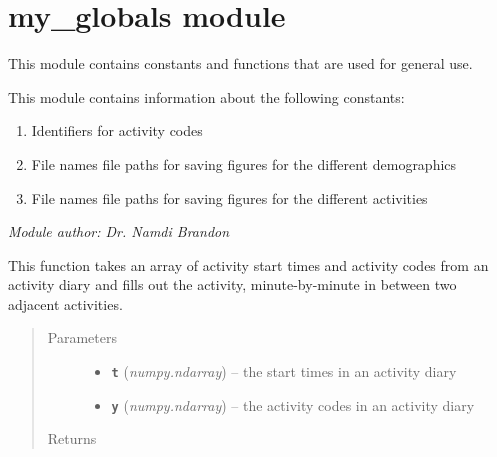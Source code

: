 \documentclass[letterpaper,10pt,english]{sphinxmanual}
\begin{document}
\section{my\_globals module}
\label{my_globals::doc}\label{my_globals:module-my_globals}\label{my_globals:my-globals-module}
This module contains constants and functions that are used for general use.

This module contains information about the following constants:
\begin{enumerate}
\item {} 
Identifiers for activity codes

\item {} 
File names file paths for saving figures for the different demographics

\item {} 
File names file paths for saving figures for the different activities

\end{enumerate}

\emph{Module author: Dr. Namdi Brandon}

\begin{fulllineitems}
\label{my_globals:my_globals.fill_out_data}
This function takes an array of activity start times and activity codes from an activity diary and     fills out the activity, minute-by-minute in between two adjacent activities.
\begin{quote}\begin{description}
\item[{Parameters}] \leavevmode\begin{itemize}
\item {} 
\textbf{\texttt{t}} (\emph{numpy.ndarray}) -- the start times in an activity diary

\item {} 
\textbf{\texttt{y}} (\emph{numpy.ndarray}) -- the activity codes in an activity diary

\end{itemize}

\item[{Returns}] \leavevmode


\end{description}\end{quote}

\end{fulllineitems}
\end{document}
